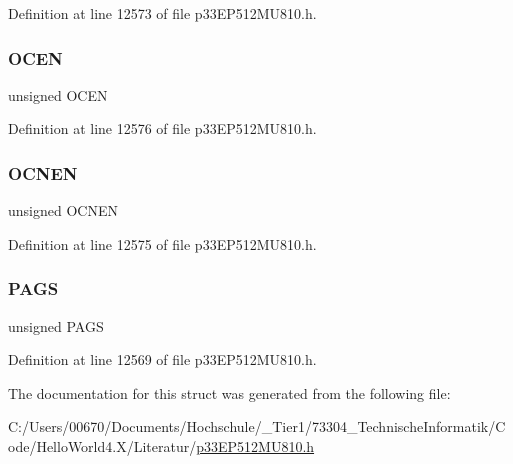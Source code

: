 Definition at line 12573 of file p33\+E\+P512\+M\+U810.\+h.

\mbox{\label{structtag_c_m3_m_s_k_c_o_n_b_i_t_s_ad7c118cfef34dec7ba06f5968b47200c}} 
\subsubsection{\texorpdfstring{O\+C\+EN}{OCEN}}
{\footnotesize\ttfamily unsigned O\+C\+EN}



Definition at line 12576 of file p33\+E\+P512\+M\+U810.\+h.

\mbox{\label{structtag_c_m3_m_s_k_c_o_n_b_i_t_s_a8bee27f84106873154bb0f1b9d244ebd}} 
\subsubsection{\texorpdfstring{O\+C\+N\+EN}{OCNEN}}
{\footnotesize\ttfamily unsigned O\+C\+N\+EN}



Definition at line 12575 of file p33\+E\+P512\+M\+U810.\+h.

\mbox{\label{structtag_c_m3_m_s_k_c_o_n_b_i_t_s_af5feed07d2e415c635200336f0f05e41}} 
\subsubsection{\texorpdfstring{P\+A\+GS}{PAGS}}
{\footnotesize\ttfamily unsigned P\+A\+GS}



Definition at line 12569 of file p33\+E\+P512\+M\+U810.\+h.



The documentation for this struct was generated from the following file\+:\begin{DoxyCompactItemize}
\item 
C\+:/\+Users/00670/\+Documents/\+Hochschule/\+\_\+\+Tier1/73304\+\_\+\+Technische\+Informatik/\+Code/\+Hello\+World4.\+X/\+Literatur/\hyperlink{p33_e_p512_m_u810_8h}{p33\+E\+P512\+M\+U810.\+h}\end{DoxyCompactItemize}
